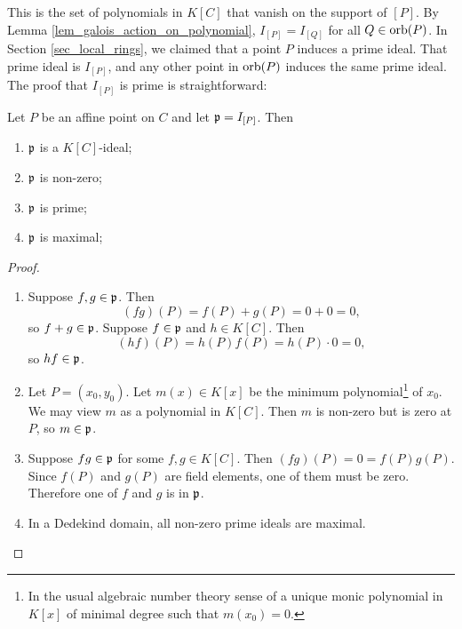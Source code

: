 This is the set of polynomials in $K[C]$ that vanish on the support of $[P]$.
By Lemma \ref{lem_galois_action_on_polynomial}, $I_{[P]} = I_{[Q]}$ for all $Q \in \operatorname{orb}(P)$.
In Section \ref{sec_local_rings}, we claimed that a point $P$ induces a prime ideal.
That prime ideal is $I_{[P]}$, and any other point in $\operatorname{orb}(P)$ induces the same prime ideal.
The proof that $I_{[P]}$ is prime is straightforward:

\begin{proposition}
  \label{prop_I_P_is_prime}
  Let $P$ be an affine point on $C$ and let $\frak p = I_{[P]}$. Then
  \begin{enumerate}[label=(\roman*)]
    \item $\frak p$ is a $K[C]$-ideal;
    \item $\frak p$ is non-zero;
    \item $\frak p$ is prime;
    \item $\frak p$ is maximal;
  \end{enumerate}
\end{proposition}
\begin{proof}
  \begin{enumerate}[label=(\roman*)]
    \item
    Suppose $f, g \in \frak p$. Then
      \[ (fg)(P) = f(P) + g(P) = 0 + 0 = 0, \]
    so $f + g \in \frak p$.
    Suppose $f \in \frak p$ and $h \in K[C]$. Then
      \[ (hf)(P) = h(P)f(P) = h(P)\cdot 0 = 0, \]
    so $hf \in \frak p$.
    
    \item
    Let $P = (x_0, y_0)$.
    Let $m(x) \in K[x]$ be the minimum polynomial\footnote{
    In the usual algebraic number theory sense of a unique monic polynomial in $K[x]$
    of minimal degree such that $m(x_0) = 0$.}
    of $x_0$.
    We may view $m$ as a polynomial in $K[C]$.
    Then $m$ is non-zero but is zero at $P$, so $m \in \frak p$.
    
    \item
    Suppose $fg \in \frak p$ for some $f, g \in K[C]$.
    Then $(fg)(P) = 0 = f(P)g(P)$.
    Since $f(P)$ and $g(P)$ are field elements, one of them must be zero.
    Therefore one of $f$ and $g$ is in $\frak p$.
    
    \item
    In a Dedekind domain, all non-zero prime ideals are maximal.\qedhere
  \end{enumerate}
\end{proof}

